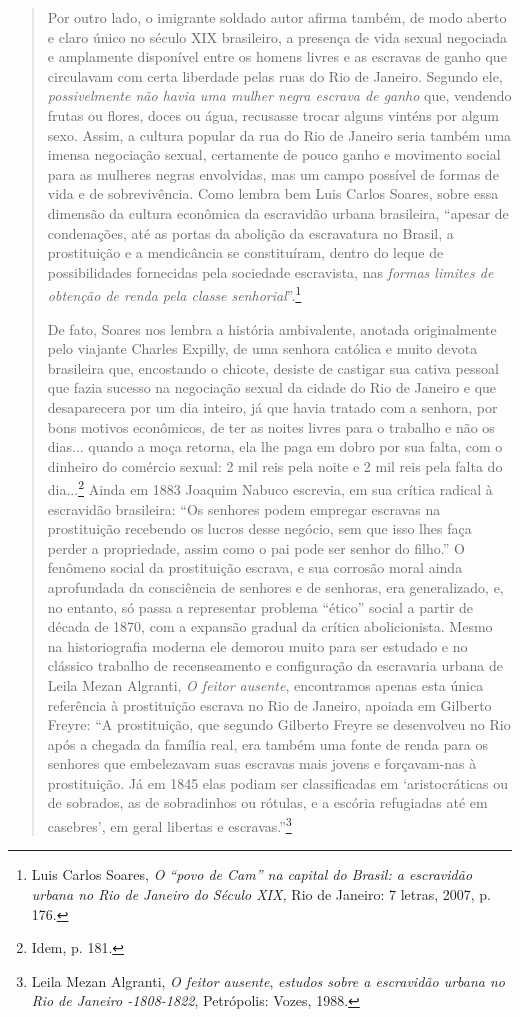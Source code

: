 \begin{quote}
Por outro lado, o imigrante soldado autor afirma também, de modo aberto
e claro único no século XIX brasileiro, a presença de vida sexual
negociada e amplamente disponível entre os homens livres e as escravas
de ganho que circulavam com certa liberdade pelas ruas do Rio de
Janeiro. Segundo ele, \emph{possivelmente não havia uma mulher negra
escrava de ganho} que, vendendo frutas ou flores, doces ou água,
recusasse trocar alguns vinténs por algum sexo. Assim, a cultura popular
da rua do Rio de Janeiro seria também uma imensa negociação sexual,
certamente de pouco ganho e movimento social para as mulheres negras
envolvidas, mas um campo possível de formas de vida e de sobrevivência.
Como lembra bem Luis Carlos Soares, sobre essa dimensão da cultura
econômica da escravidão urbana brasileira, ``apesar de condenações, até
as portas da abolição da escravatura no Brasil, a prostituição e a
mendicância se constituíram, dentro do leque de possibilidades
fornecidas pela sociedade escravista, nas \emph{formas limites de
obtenção de renda pela classe senhorial}''.\footnote{Luis Carlos Soares,
  \emph{O ``povo de Cam'' na capital do Brasil: a escravidão urbana no
  Rio de Janeiro do Século XIX,} Rio de Janeiro: 7 letras, 2007, p. 176.}

De fato, Soares nos lembra a história ambivalente, anotada originalmente
pelo viajante Charles Expilly, de uma senhora católica e muito devota
brasileira que, encostando o chicote, desiste de castigar sua cativa
pessoal que fazia sucesso na negociação sexual da cidade do Rio de
Janeiro e que desaparecera por um dia inteiro, já que havia tratado com
a senhora, por bons motivos econômicos, de ter as noites livres para o
trabalho e não os dias... quando a moça retorna, ela lhe paga em dobro
por sua falta, com o dinheiro do comércio sexual: 2 mil reis pela noite
e 2 mil reis pela falta do dia...\footnote{Idem, p. 181.} Ainda em 1883
Joaquim Nabuco escrevia, em sua crítica radical à escravidão brasileira:
``Os senhores podem empregar escravas na prostituição recebendo os
lucros desse negócio, sem que isso lhes faça perder a propriedade, assim
como o pai pode ser senhor do filho.'' O fenômeno social da prostituição
escrava, e sua corrosão moral ainda aprofundada da consciência de
senhores e de senhoras, era generalizado, e, no entanto, só passa a
representar problema ``ético'' social a partir de década de 1870, com a
expansão gradual da crítica abolicionista. Mesmo na historiografia
moderna ele demorou muito para ser estudado e no clássico trabalho de
recenseamento e configuração da escravaria urbana de Leila Mezan
Algranti, \emph{O feitor ausente}, encontramos apenas esta única
referência à prostituição escrava no Rio de Janeiro, apoiada em Gilberto
Freyre: ``A prostituição, que segundo Gilberto Freyre se desenvolveu no
Rio após a chegada da família real, era também uma fonte de renda para
os senhores que embelezavam suas escravas mais jovens e forçavam-nas à
prostituição. Já em 1845 elas podiam ser classificadas em
`aristocráticas ou de sobrados, as de sobradinhos ou rótulas, e a
escória refugiadas até em casebres', em geral libertas e
escravas.''\footnote{Leila Mezan Algranti, \emph{O feitor ausente},
  \emph{estudos sobre a escravidão urbana no Rio de Janeiro -1808-1822},
  Petrópolis: Vozes, 1988.}


\end{quote}
